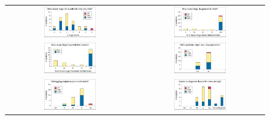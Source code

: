 \begin{figure}[p]
	\begin{center}
		\begin{tabular}{cc}
			\includegraphics[width=0.42\textwidth]{survey1.pdf} &
			\includegraphics[width=0.42\textwidth]{survey2.pdf} \\
			\includegraphics[width=0.42\textwidth]{survey3.pdf} &
			\includegraphics[width=0.42\textwidth]{survey4.pdf} \\
			\includegraphics[width=0.42\textwidth]{survey5.pdf} &
			\includegraphics[width=0.42\textwidth]{survey6.pdf} \\

\end{tabular}
\end{center}
\end{figure}
